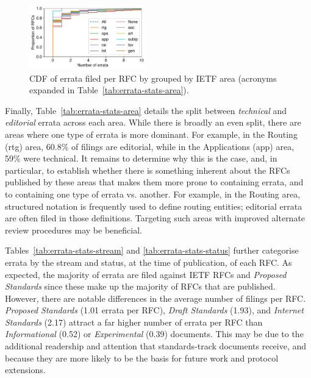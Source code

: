 \documentclass[twocolumn,10pt]{article}
\begin{document}
\begin{figure}
\includegraphics[width=0.45\textwidth]{figures-prev/tma-2023/errata-by-rfc-by-area.pdf}
\caption{CDF of errata filed per RFC by grouped by IETF area (acronyms
  expanded in Table~\ref{tab:errata-stats-area}).}
\label{fig:errata_per_rfc}
\end{figure}

Finally, Table~\ref{tab:errata-stats-area} details the split between
\emph{technical} and \emph{editorial} errata across each area. While there
is broadly an even split, there are areas where one type of errata is more
dominant. For example, in the Routing (rtg) area, 60.8\% of filings are
editorial, while in the Applications (app) area, 59\% were technical.  It
remains to determine why this is the case, and, in particular, to establish
whether there is something inherent about the RFCs published by these areas
that makes them more prone to containing errata, and to containing one type
of errata vs. another. For example, in the Routing area, structured
notation is frequently used to define routing entities; editorial errata
are often filed in those definitions. Targeting such areas with improved
alternate review procedures may be beneficial.

Tables~\ref{tab:errata-stats-stream} and \ref{tab:errata-stats-status}
further categorise errata by the stream and status, at the time of
publication, of each RFC. As expected, the majority of errata are filed
against IETF RFCs and \emph{Proposed Standards} since these make up the
majority of RFCs that are published. However, there are notable differences
in the average number of filings per RFC. \emph{Proposed Standards} (1.01
errata per RFC), \emph{Draft Standards} (1.93), and \emph{Internet
Standards} (2.17) attract a far higher number of errata per RFC than
\emph{Informational} (0.52) or \emph{Experimental} (0.39) documents. This
may be due to the additional readership and attention that standards-track
documents receive, and because they are more likely to be the basis for
future work and protocol extensions.



\end{document}
